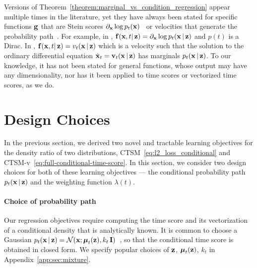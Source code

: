 Versions of Theorem~\ref{theorem:marginal_vs_condition_regression} appear multiple times in the literature, yet they have always been stated for specific functions $\operatorname{\mathbf{g}}$ that are Stein scores $\partial_{\operatorname{\mathbf{x}}} \log p_t(\operatorname{\mathbf{x}})$~\citep{vincent2011denoisingscorematching,song2021sde} or velocities that generate the probability path~\citep{lipman2023conditionalflowmatching, pooladian2023conditionalflowmatching, tong2024conditionalflowmatching}.
For example, in \citet{vincent2011denoisingscorematching}, $\operatorname{\mathbf{f}}(\operatorname{\mathbf{x}}, t | \operatorname{\mathbf{z}}) = \partial_{\operatorname{\mathbf{x}}} \log p_t(\operatorname{\mathbf{x}} | \operatorname{\mathbf{z}})$ and $p(t)$ is a Dirac. 
In \citet{tong2024conditionalflowmatching}, $\operatorname{\mathbf{f}}(\operatorname{\mathbf{x}}, t | \operatorname{\mathbf{z}}) = v_t(\operatorname{\mathbf{x}} | \operatorname{\mathbf{z}})$ which is a velocity  such that the solution to the ordinary differential equation $\dot{\operatorname{\mathbf{x}}}_t = \operatorname{\mathbf{v}}_t(\operatorname{\mathbf{x}} | \operatorname{\mathbf{z}})$ has marginals $p_t(\operatorname{\mathbf{x}} | \operatorname{\mathbf{z}})$. To our knowledge, it has not been stated for general functions, whose output may have any dimensionality, nor has it been applied to time scores or vectorized time scores, as we do. 

\section{Design Choices}
\label{sec:design_choices}

In the previous section, we derived two novel and tractable learning objectives for the density ratio of two distributions, CTSM~\eqref{eq:l2_loss_conditional} and CTSM-v~\eqref{eq:full-conditional-time-score}. In this section, we consider two design choices for both of these learning objectives --- the conditional probability path $p_t(\operatorname{\mathbf{x}} | \operatorname{\mathbf{z}})$ and the weighting function $\lambda(t)$.  

\paragraph{Choice of probability path}
Our regression objectives require computing the time score and its vectorization of a conditional density that is analytically known. It is common to choose a Gaussian $p_{t}(\operatorname{\mathbf{x}}|\operatorname{\mathbf{z}}) = \mathcal{N}(\operatorname{\mathbf{x}} ; \operatorname{\bm{\mu}}_{t}(\operatorname{\mathbf{z}}),k_{t}\operatorname{\mathbf{I}})$~\citep{lipman2023conditionalflowmatching}, so that the conditional time score is obtained in closed form. We specify popular choices of $\operatorname{\mathbf{z}}$, $\operatorname{\bm{\mu}}_t(\operatorname{\mathbf{z}})$, $k_t$ in Appendix~\ref{app:sec:mixture}. 

